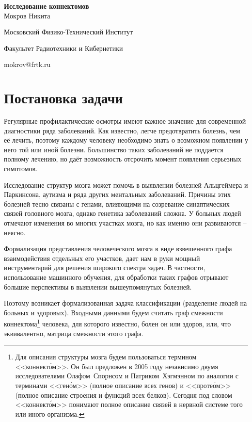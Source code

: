 \documentclass{urticle}
\begin{document}
\begin{center}
{\LARGE \textbf{Исследование коннектомов\\}}
\vspace{1cm}
{\Large Мокров Никита}

{\large Московский Физико-Технический Институт}

{\large Факультет Радиотехники и Кибернетики}

{\large mokrov@frtk.ru}
\end{center}

\section*{Постановка задачи}
Регулярные профилактические осмотры имеют важное значение для современной диагностики ряда заболеваний. Как известно, легче предотвратить болезнь, чем её лечить, поэтому каждому человеку необходимо знать о возможном появлении у него той или иной болезни. Большинство таких заболеваний не поддается полному лечению, но даёт возможность отсрочить момент появления серьезных симптомов.

Исследование структур мозга может помочь в выявлении болезней Альцгеймера и Паркинсона, аутизма и ряда других ментальных заболеваний. Причины этих болезней тесно связаны с генами, влияющими на созревание синаптических связей головного мозга, однако генетика заболеваний сложна. У больных людей отмечают изменения во многих участках мозга, но как именно они развиваются -- неясно.

Формализация представления человеческого мозга в виде взвешенного графа взаимодействия отдельных его участков, дает нам в руки мощный инструментарий для решения широкого спектра задач. В частности, использование машинного обучения, для обработки таких графов отрывают большие перспективы в выявлении вышеупомянутых болезней.

Поэтому возникает формализованная задача классификации (разделение людей на больных и здоровых). Входными данными будем считать граф смежности коннектома\footnote{Для описания структуры мозга будем пользоваться термином <<коннект\'{о}м>>. Он был предложен в 2005 году независимо двумя исследователями Олафом~Спорнсом и Патриком~Хэгмэнном по аналогии с терминами <<ген\'{о}м>> (полное описание всех генов) и <<проте\'{о}м>> (полное описание строения и функций всех белков). Сегодня под словом <<коннект\'{о}м>> понимают полное описание связей в нервной системе того или иного организма.} человека, для которого известно, болен он или здоров, или, что эквивалентно, матрица смежности этого графа.
\end{document}
